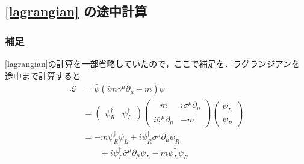 \documentclass[pdflatex,unicode,ja=standard,12pt]{beamer}
\begin{document}
\subsection{\texorpdfstring{%
  \eqref{lagrangian}%
  }{
  ラグランジアン
}の途中計算}
\label{q3_appendix}

\begin{frame}[noframenumbering]

  \frametitle{補足\ \subsecname}
  \thispagestyle{empty}

  \eqref{lagrangian}の計算を一部省略していたので，ここで補足を．ラグランジアンを途中まで計算すると
  \begin{align}
    \mathcal{L}
    &=
    \bar{\psi}(im\gamma^{\mu}\partial_{\mu}-m)\psi
    \nonumber
    \\
    &=
    \begin{pmatrix}
      \psi_{R}^{\dag} & \psi_{L}^{\dag}
    \end{pmatrix}
    \begin{pmatrix}
      -m & i\sigma^{\mu}\partial_{\mu} \\
      i\bar{\sigma}^{\mu}\partial_{\mu} & -m
    \end{pmatrix}
    \begin{pmatrix}
      \psi_{L} \\
      \psi_{R}
    \end{pmatrix}
    \nonumber
    \\
    &=
    -m\psi_{R}^{\dag}\psi_{L}
    +
    i\psi_{R}^{\dag}\sigma^{\mu}\partial_{\mu}\psi_{R}
    \nonumber
    \\
    &\qquad
    +
    i\psi_{L}^{\dag}\bar{\sigma}^{\mu}\partial_{\mu}\psi_{L}
    -
    m\psi_{L}^{\dag}\psi_{R}
    \label{append3_1}
  \end{align}

\end{frame}
\end{document}
